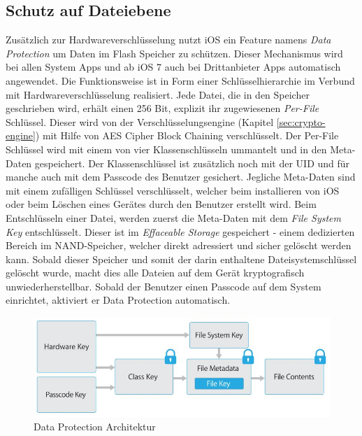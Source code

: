 	\subsection{Schutz auf Dateiebene}\label{sec:filesecurity}
		Zusätzlich zur Hardwareverschlüsselung nutzt iOS ein Feature namens \textsl{Data
		Protection} um Daten im Flash Speicher zu schützen. Dieser Mechanismus
		wird bei allen System Apps und ab iOS 7 auch bei Drittanbieter Apps
		automatisch angewendet. Die Funktionsweise ist in Form einer
		Schlüsselhierarchie im Verbund mit Hardwareverschlüsselung realisiert. Jede
		Datei, die in den Speicher geschrieben wird, erhält einen 256 Bit, explizit
		ihr zugewiesenen \textsl{Per-File} Schlüssel. Dieser wird von der
		Verschlüsselungsengine (Kapitel \ref{sec:crypto-engine}) mit Hilfe von
		AES Cipher Block Chaining verschlüsselt. Der Per-File Schlüssel wird mit
		einem von vier Klassenschlüsseln ummantelt und in den Meta-Daten gespeichert.
		Der Klassenschlüssel ist zusätzlich noch mit der UID und für manche auch mit
		dem Passcode des Benutzer gesichert. Jegliche Meta-Daten sind mit einem
		zufälligen Schlüssel verschlüsselt, welcher beim installieren von iOS oder
		beim Löschen eines Gerätes durch den Benutzer erstellt wird. Beim
		Entschlüsseln einer Datei, werden zuerst die Meta-Daten mit dem \textsl{File
		System Key} entschlüsselt. Dieser ist im \textsl{Effaceable Storage}
		gespeichert - einem dedizierten Bereich im NAND-Speicher, welcher direkt
		adressiert und sicher gelöscht werden kann.
		Sobald dieser Speicher und somit der darin enthaltene Dateisystemschlüssel
		gelöscht wurde, macht dies alle Dateien auf dem Gerät kryptografisch
		unwiederherstellbar. Sobald der Benutzer einen Passcode auf dem System
		einrichtet, aktiviert er Data Protection automatisch.
		\begin{figure}[h]
			\centering
			\includegraphics[width=0.9\linewidth]{ios/media/data-protection.jpg}
			\caption{Data Protection Architektur 
			\cite[S.10]{iOSSecurityApr2015}}
			\label{fig:data-protection}
		\end{figure}

